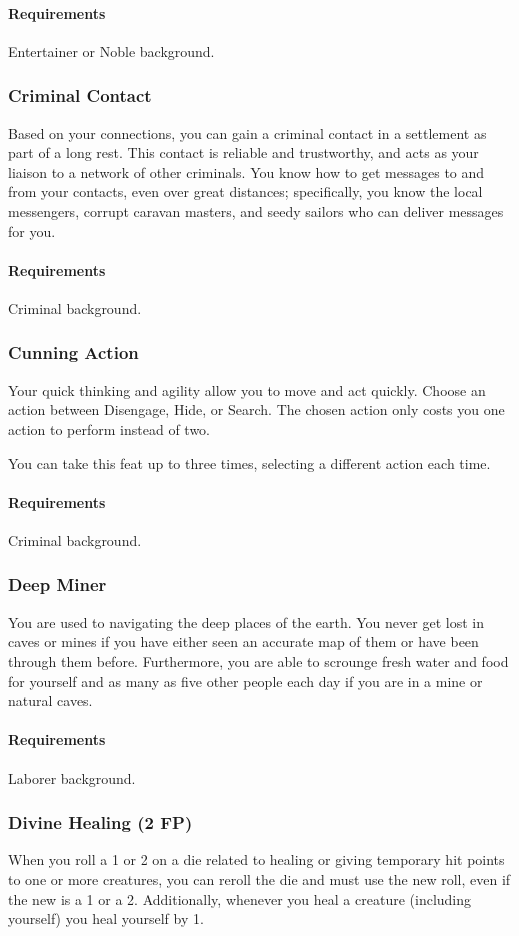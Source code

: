     \paragraph{Requirements} Entertainer or Noble background.
\subsubsection{Criminal Contact} \label{feat::criminalcontact}
    Based on your connections, you can gain a criminal contact in a settlement as part of a long rest.
    This contact is reliable and trustworthy, and acts as your liaison to a network of other criminals.
    You know how to get messages to and from your contacts, even over great distances; specifically, you know the local messengers, corrupt caravan masters, and seedy sailors who can deliver messages for you.
    \paragraph{Requirements} Criminal background.
\subsubsection{Cunning Action} \label{feat::cunningaction}
    Your quick thinking and agility allow you to move and act quickly.
    Choose an action between Disengage, Hide, or Search.
    The chosen action only costs you one action to perform instead of two.

    You can take this feat up to three times, selecting a different action each time.
    \paragraph{Requirements} Criminal background.
\subsubsection{Deep Miner} \label{feat::deepminer}
    You are used to navigating the deep places of the earth.
    You never get lost in caves or mines if you have either seen an accurate map of them or have been through them before.
    Furthermore, you are able to scrounge fresh water and food for yourself and as many as five other people each day if you are in a mine or natural caves.
    \paragraph{Requirements} Laborer background.
\subsubsection{Divine Healing (2 FP)} \label{feat::divinehealing}
    When you roll a 1 or 2 on a die related to healing or giving temporary hit points to one or more creatures, you can reroll the die and must use the new roll, even if the new is a 1 or a 2.
    Additionally, whenever you heal a creature (including yourself) you heal yourself by 1.
